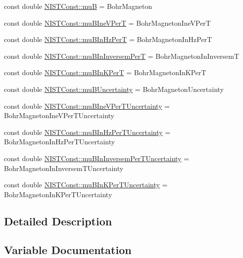 \begin{DoxyCompactItemize}
const double \hyperlink{group___bohr_magneton_gab42ee32e5e0323fc6268a5e14ac40b39}{N\+I\+S\+T\+Const\+::muB} = Bohr\+Magneton
\item 
const double \hyperlink{group___bohr_magneton_gad2bd4164d07de53146b14398c6d4790d}{N\+I\+S\+T\+Const\+::mu\+B\+Ine\+V\+PerT} = Bohr\+Magneton\+Ine\+V\+PerT
\item 
const double \hyperlink{group___bohr_magneton_gac590bf03985de37cfaeea7982dac2aa8}{N\+I\+S\+T\+Const\+::mu\+B\+In\+Hz\+PerT} = Bohr\+Magneton\+In\+Hz\+PerT
\item 
const double \hyperlink{group___bohr_magneton_ga4d426841ef01963272df91bd0534a966}{N\+I\+S\+T\+Const\+::mu\+B\+In\+Inversem\+PerT} = Bohr\+Magneton\+In\+InversemT
\item 
const double \hyperlink{group___bohr_magneton_ga51473ab154d1c4e8e9afca84952db156}{N\+I\+S\+T\+Const\+::mu\+B\+In\+K\+PerT} = Bohr\+Magneton\+In\+K\+PerT
\item 
const double \hyperlink{group___bohr_magneton_ga6f7d483b5984d92f63b7fbe199fa3985}{N\+I\+S\+T\+Const\+::mu\+B\+Uncertainty} = Bohr\+Magneton\+Uncertainty
\item 
const double \hyperlink{group___bohr_magneton_ga3090988be27d3988c99418e32a538a18}{N\+I\+S\+T\+Const\+::mu\+B\+Ine\+V\+Per\+T\+Uncertainty} = Bohr\+Magneton\+Ine\+V\+Per\+T\+Uncertainty
\item 
const double \hyperlink{group___bohr_magneton_gadcf78ed6cafce3517c8dc7d308c06cc2}{N\+I\+S\+T\+Const\+::mu\+B\+In\+Hz\+Per\+T\+Uncertainty} = Bohr\+Magneton\+In\+Hz\+Per\+T\+Uncertainty
\item 
const double \hyperlink{group___bohr_magneton_ga51cabaa66ef3fd011187bc9ad5226cc8}{N\+I\+S\+T\+Const\+::mu\+B\+In\+Inversem\+Per\+T\+Uncertainty} = Bohr\+Magneton\+In\+Inversem\+T\+Uncertainty
\item 
const double \hyperlink{group___bohr_magneton_ga3e329894e17506d60948fd563cee0368}{N\+I\+S\+T\+Const\+::mu\+B\+In\+K\+Per\+T\+Uncertainty} = Bohr\+Magneton\+In\+K\+Per\+T\+Uncertainty
\end{DoxyCompactItemize}


\subsection{Detailed Description}


\subsection{Variable Documentation}
\mbox{\label{group___bohr_magneton_gaace59be8951a23257cedcbef8f320c66}} 
